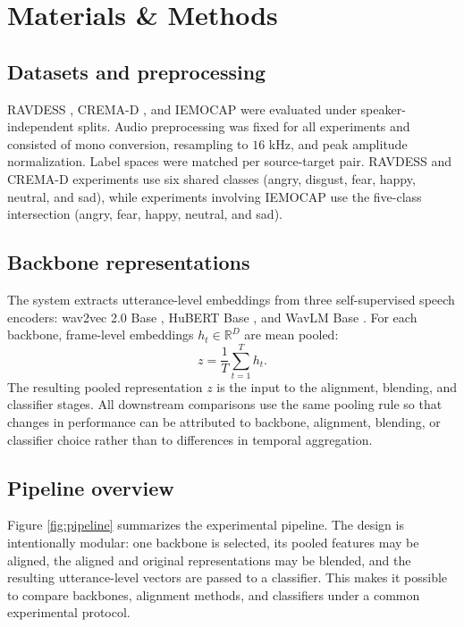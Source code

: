 ﻿\documentclass[10pt,twocolumn,letterpaper]{article}
\begin{document}
\section{Materials \& Methods}
\subsection{Datasets and preprocessing}
RAVDESS \cite{livingstone2018ryerson}, CREMA-D \cite{cao2014crema}, and IEMOCAP \cite{busso2008iemocap} were evaluated under speaker-independent splits. Audio preprocessing was fixed for all experiments and consisted of mono conversion, resampling to $16$ kHz, and peak amplitude normalization. Label spaces were matched per source-target pair. RAVDESS and CREMA-D experiments use six shared classes (angry, disgust, fear, happy, neutral, and sad), while experiments involving IEMOCAP use the five-class intersection (angry, fear, happy, neutral, and sad).

\subsection{Backbone representations}
The system extracts utterance-level embeddings from three self-supervised speech encoders: wav2vec 2.0 Base \cite{baevski2020wav2vec}, HuBERT Base \cite{hsu2021hubert}, and WavLM Base \cite{chen2022wavlm}. For each backbone, frame-level embeddings $h_t \in \mathbb{R}^{D}$ are mean pooled:
\begin{equation}
z = \frac{1}{T}\sum_{t=1}^{T} h_t.
\end{equation}
The resulting pooled representation $z$ is the input to the alignment, blending, and classifier stages. All downstream comparisons use the same pooling rule so that changes in performance can be attributed to backbone, alignment, blending, or classifier choice rather than to differences in temporal aggregation.

\subsection{Pipeline overview}
Figure \ref{fig:pipeline} summarizes the experimental pipeline. The design is intentionally modular: one backbone is selected, its pooled features may be aligned, the aligned and original representations may be blended, and the resulting utterance-level vectors are passed to a classifier. This makes it possible to compare backbones, alignment methods, and classifiers under a common experimental protocol.
\end{document}
